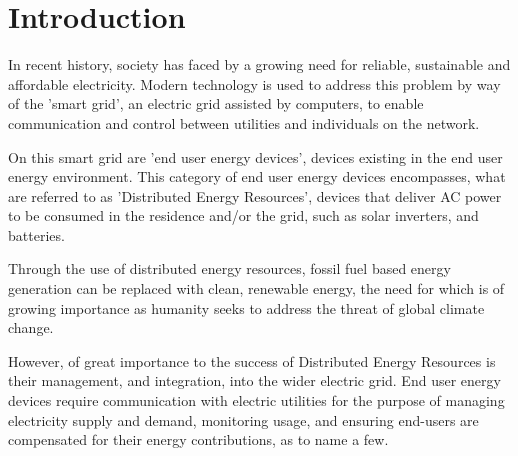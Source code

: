 \chapter{Introduction}\label{ch:intro}
In recent history, society has faced by a growing need for reliable, sustainable and affordable electricity.
Modern technology is used to address this problem by way of the 'smart grid', an electric grid assisted by computers, to enable communication and control between utilities and individuals on the network.

On this smart grid are 'end user energy devices', devices existing in the end user energy environment.
This category of end user energy devices encompasses, what are referred to as 'Distributed Energy Resources',
devices that deliver AC power to be consumed in the residence and/or the grid, such as solar inverters, and batteries. \cite{IEEE2030.5}

Through the use of distributed energy resources, fossil fuel based energy generation can be replaced with clean, 
renewable energy, the need for which is of growing importance as humanity seeks to address the threat of global climate change.

However, of great importance to the success of Distributed Energy Resources is their management, and integration, into the wider electric grid.
End user energy devices require communication with electric utilities for the purpose of managing electricity supply and demand, monitoring usage, 
and ensuring end-users are compensated for their energy contributions, as to name a few.




